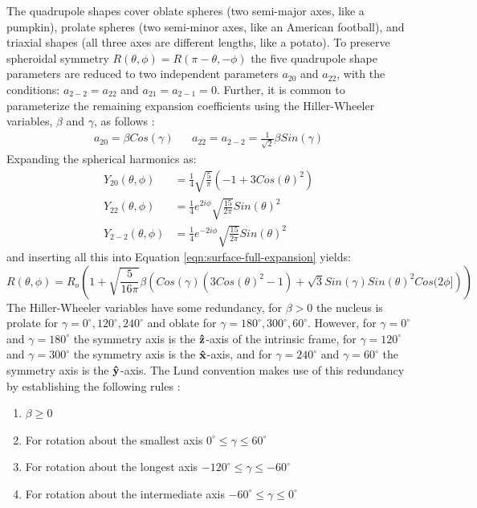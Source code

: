 The quadrupole shapes cover oblate spheres (two semi-major axes, like a pumpkin), prolate spheres (two semi-minor axes, like an American football), and triaxial shapes (all three axes are different lengths, like a potato). To preserve spheroidal symmetry $R(\theta,\phi) = R(\pi - \theta,-\phi)$ the five quadrupole shape parameters are reduced to two independent parameters $a_{2 0}$ and $a_{2 2}$, with the conditions: $a_{2 -2}=a_{2 2}$ and $a_{2 1}=a_{2 -1}=0$. Further, it is common to parameterize the remaining expansion coefficients using the Hiller-Wheeler variables, $\beta$ and $\gamma$, as follows \cite{wongBook}:
\begin{align}
\label{eqn:chp2-hiller-wheeler}
a_{2 0} = \beta Cos(\gamma)  & &  a_{2 2} = a_{2 -2} = \frac{1}{\sqrt{2}}\beta Sin(\gamma)
\end{align}
Expanding the spherical harmonics as:
\begin{align}
\label{eqn:spherical-harmonics}
Y_{2 0}(\theta, \phi) &= \frac{1}{4} \sqrt{\frac{5}{\pi }} \left(-1+3 Cos(\theta )^2\right)\\
Y_{2 2}(\theta, \phi) &= \frac{1}{4} e^{2 i \phi } \sqrt{\frac{15}{2 \pi }} Sin(\theta)^2\\
Y_{2 -2}(\theta, \phi) &= \frac{1}{4} e^{-2 i \phi } \sqrt{\frac{15}{2 \pi }} Sin(\theta)^2
\end{align} 
and inserting all this into Equation \ref{eqn:surface-full-expansion} yields:
\begin{equation}
\label{eqn:quadrupole-surface}
R(\theta, \phi) = R_{o}\left(1+\sqrt{\frac{5}{16 \pi }}\beta  \left(Cos(\gamma ) \left(3 Cos(\theta )^2-1\right)+\sqrt{3} Sin(\gamma ) Sin(\theta )^2Cos(2 \phi ]\right)\right)
\end{equation} 
The Hiller-Wheeler variables have some redundancy, for $\beta>0$ the nucleus is prolate for $\gamma=0^{\circ},120^{\circ},240^{\circ}$ and oblate for $\gamma=180^{\circ},300^{\circ},60^{\circ}$. However, for $\gamma=0^{\circ}$ and $\gamma=180^{\circ}$ the symmetry axis is the $\boldsymbol{\hat{\textbf{z}}}$-axis of the intrinsic frame, for $\gamma=120^{\circ}$ and $\gamma=300^{\circ}$ the symmetry axis is the $\boldsymbol{\hat{\textbf{x}}}$-axis, and for $\gamma=240^{\circ}$ and $\gamma=60^{\circ}$ the symmetry axis is the $\boldsymbol{\hat{\textbf{y}}}$-axis. The Lund convention makes use of this redundancy by establishing the following rules \cite{wongBook}:
\begin{enumerate}
\item $\beta\geq0$
\item For rotation about the smallest axis $0^{\circ}\leq\gamma\leq60^{\circ}$
\item For rotation about the longest axis $-120^{\circ}\leq\gamma\leq-60^{\circ}$
\item For rotation about the intermediate axis $-60^{\circ}\leq\gamma\leq0^{\circ}$
\end{enumerate}
